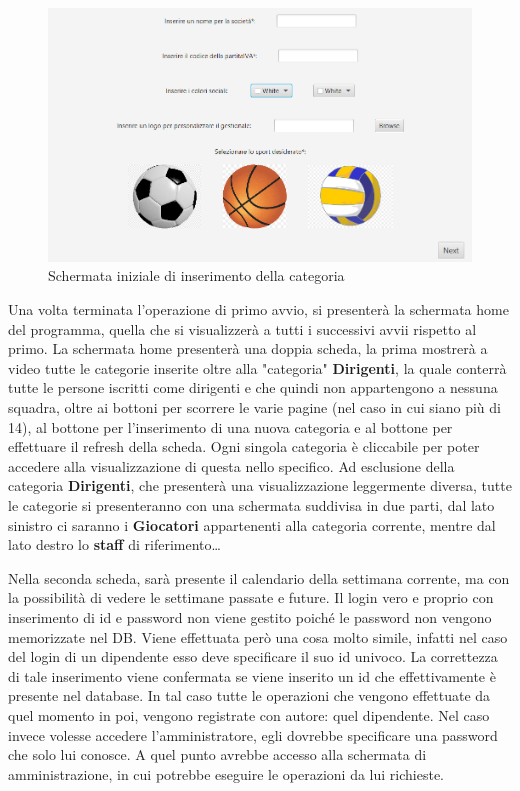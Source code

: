 \documentclass[a4paper,12pt]{report}
\begin{document}
\begin{figure}[htp]
    \centering
    \includegraphics[width = \textwidth]{GSS_report/img/schermata_iniziale.png}
    \caption{Schermata iniziale di inserimento della categoria}
    \label{fig:umlAnalisys}
\end{figure}

\newpage
Una volta terminata l'operazione di primo avvio, si presenterà la schermata home del programma, quella che si visualizzerà a tutti i successivi
avvii rispetto al primo.
La schermata home presenterà una doppia scheda, la prima mostrerà a video tutte le categorie inserite oltre alla "categoria" \textbf{Dirigenti},
la quale conterrà tutte le persone iscritti come dirigenti e che quindi non appartengono a nessuna squadra, oltre ai bottoni per scorrere le varie
pagine (nel caso in cui siano più di 14), al bottone per l'inserimento di una nuova categoria e al bottone per effettuare il refresh della scheda.
Ogni singola categoria è cliccabile per poter accedere alla visualizzazione di questa nello specifico. Ad esclusione della categoria \textbf{Dirigenti},
che presenterà una visualizzazione leggermente diversa, tutte le categorie si presenteranno con una schermata suddivisa in due parti, dal lato sinistro
ci saranno i \textbf{Giocatori} appartenenti alla categoria corrente, mentre dal lato destro lo \textbf{staff} di riferimento\dots


Nella seconda scheda, sarà presente il calendario della settimana corrente, ma con la possibilità di vedere le settimane passate e future.
Il login vero e proprio con inserimento di id e password non viene gestito poiché le password non vengono memorizzate nel DB. 
Viene effettuata però una cosa molto simile, infatti nel caso del login di un dipendente esso deve 
specificare il suo id univoco. La correttezza di tale inserimento viene confermata se viene inserito un id che 
effettivamente è presente nel database. In tal caso tutte le operazioni che vengono effettuate da quel 
momento in poi, vengono registrate con autore: quel dipendente. Nel caso invece volesse accedere 
l’amministratore, egli dovrebbe specificare una password che solo lui conosce. A quel punto avrebbe 
accesso alla schermata di amministrazione, in cui potrebbe eseguire le operazioni da lui richieste.



\end{document}
